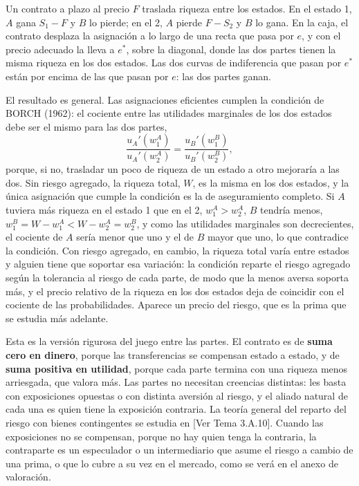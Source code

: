 \documentclass[10pt,a4paper]{article}
\newcommand{\authorfont}[1]{{\fontfamily{EBGaramond-TLF}\selectfont #1}}
\newcounter{anexo}
\begin{document}
Un contrato a plazo al precio $F$ traslada riqueza entre los estados. En el estado 1, $A$ gana $S_1-F$ y $B$ lo pierde; en el 2, $A$ pierde $F-S_2$ y $B$ lo gana. En la caja, el contrato desplaza la asignación a lo largo de una recta que pasa por $e$, y con el precio adecuado la lleva a $e^*$, sobre la diagonal, donde las dos partes tienen la misma riqueza en los dos estados. Las dos curvas de indiferencia que pasan por $e^*$ están por encima de las que pasan por $e$: las dos partes ganan.

El resultado es general. Las asignaciones eficientes cumplen la condición de BORCH (1962): el cociente entre las utilidades marginales de los dos estados debe ser el mismo para las dos partes,
$$\frac{u_A'(w_1^A)}{u_A'(w_2^A)}=\frac{u_B'(w_1^B)}{u_B'(w_2^B)},$$
porque, si no, trasladar un poco de riqueza de un estado a otro mejoraría a las dos. Sin riesgo agregado, la riqueza total, $W$, es la misma en los dos estados, y la única asignación que cumple la condición es la de aseguramiento completo. Si $A$ tuviera más riqueza en el estado 1 que en el 2, $w_1^A>w_2^A$, $B$ tendría menos, $w_1^B=W-w_1^A<W-w_2^A=w_2^B$, y como las utilidades marginales son decrecientes, el cociente de $A$ sería menor que uno y el de $B$ mayor que uno, lo que contradice la condición. Con riesgo agregado, en cambio, la riqueza total varía entre estados y alguien tiene que soportar esa variación: la condición reparte el riesgo agregado según la tolerancia al riesgo de cada parte, de modo que la menos aversa soporta más, y el precio relativo de la riqueza en los dos estados deja de coincidir con el cociente de las probabilidades. Aparece un precio del riesgo, que es la prima que se estudia más adelante.

Esta es la versión rigurosa del juego entre las partes. El contrato es de \textbf{suma cero en dinero}, porque las transferencias se compensan estado a estado, y de \textbf{suma positiva en utilidad}, porque cada parte termina con una riqueza menos arriesgada, que valora más. Las partes no necesitan creencias distintas: les basta con exposiciones opuestas o con distinta aversión al riesgo, y el aliado natural de cada una es quien tiene la exposición contraria. La teoría general del reparto del riesgo con bienes contingentes se estudia en [\authorfont{Ver Tema 3.A.10}]. Cuando las exposiciones no se compensan, porque no hay quien tenga la contraria, la contraparte es un especulador o un intermediario que asume el riesgo a cambio de una prima, o que lo cubre a su vez en el mercado, como se verá en el anexo de valoración.
\end{document}
